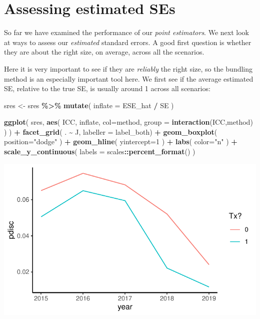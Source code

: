 \documentclass[
]{book}
\newenvironment{Shaded}{\begin{snugshade}}{\end{snugshade}}
\newcommand{\AttributeTok}[1]{\textcolor[rgb]{0.13,0.29,0.53}{#1}}
\newcommand{\DecValTok}[1]{\textcolor[rgb]{0.00,0.00,0.81}{#1}}
\newcommand{\FunctionTok}[1]{\textcolor[rgb]{0.13,0.29,0.53}{\textbf{#1}}}
\newcommand{\NormalTok}[1]{#1}
\newcommand{\OtherTok}[1]{\textcolor[rgb]{0.56,0.35,0.01}{#1}}
\newcommand{\SpecialCharTok}[1]{\textcolor[rgb]{0.81,0.36,0.00}{\textbf{#1}}}
\newcommand{\StringTok}[1]{\textcolor[rgb]{0.31,0.60,0.02}{#1}}
\begin{document}
\section{Assessing estimated SEs}\label{assessing-estimated-ses}

So far we have examined the performance of our \emph{point estimators}.
We next look at ways to assess our \emph{estimated} standard errors.
A good first question is whether they are about the right size, on average, across all the scenarios.

Here it is very important to see if they are \emph{reliably} the right size, so the bundling method is an especially important tool here.
We first see if the average estimated SE, relative to the true SE, is usually around 1 across all scenarios:

\begin{Shaded}
\begin{Highlighting}[]
\NormalTok{sres }\OtherTok{\textless{}{-}}\NormalTok{ sres }\SpecialCharTok{\%\textgreater{}\%}
  \FunctionTok{mutate}\NormalTok{( }\AttributeTok{inflate =}\NormalTok{ ESE\_hat }\SpecialCharTok{/}\NormalTok{ SE  ) }

\FunctionTok{ggplot}\NormalTok{( sres,}
        \FunctionTok{aes}\NormalTok{( ICC, inflate, }\AttributeTok{col=}\NormalTok{method,}
             \AttributeTok{group =} \FunctionTok{interaction}\NormalTok{(ICC,method) ) ) }\SpecialCharTok{+}
    \FunctionTok{facet\_grid}\NormalTok{( . }\SpecialCharTok{\textasciitilde{}}\NormalTok{ J, }\AttributeTok{labeller =}\NormalTok{ label\_both) }\SpecialCharTok{+}
  \FunctionTok{geom\_boxplot}\NormalTok{( }\AttributeTok{position=}\StringTok{"dodge"}\NormalTok{ ) }\SpecialCharTok{+}
  \FunctionTok{geom\_hline}\NormalTok{( }\AttributeTok{yintercept=}\DecValTok{1}\NormalTok{ ) }\SpecialCharTok{+}
  \FunctionTok{labs}\NormalTok{( }\AttributeTok{color=}\StringTok{"n"}\NormalTok{ ) }\SpecialCharTok{+}
  \FunctionTok{scale\_y\_continuous}\NormalTok{( }\AttributeTok{labels =}\NormalTok{ scales}\SpecialCharTok{::}\FunctionTok{percent\_format}\NormalTok{() ) }
\end{Highlighting}
\end{Shaded}

\begin{center}\includegraphics[width=0.75\linewidth]{Designing-Simulations-in-R_files/figure-latex/unnamed-chunk-241-1} \end{center}
\end{document}
